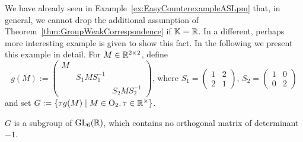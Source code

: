 We have already seen in Example~\ref{ex:EasyCounterexampleASLpm} that, in general, we cannot drop the additional assumption of Theorem~\ref{thm:GroupWeakCorrespondence} if $\mathbb K=\mathbb R$. In \cite{SiagaPaper} a different, perhaps more interesting example is given to show this fact. 
In the following we present this example \cite[Example~3.5]{SiagaPaper} in detail. For $M \in \mathbb R^{2 \times 2}$, define
\begin{equation}\label{eq:AKRSgroupExample3-5}
	g(M) := \begin{pmatrix} M & & \\ & S_1 M S_1^{-1} & \\ & & S_2 M S_2^{-1}	\end{pmatrix} \text{, where }
	S_1 = \begin{pmatrix} 1 & 2 \\ 2 & 1 \end{pmatrix}, \,
	S_2 = \begin{pmatrix} 1 & 0 \\ 0 & 2 \end{pmatrix}
\end{equation}
and set $G := \left\lbrace \tau g(M) \mid M \in \operatorname{O}_2, \tau \in \mathbb R^{\times} \right\rbrace$.

\begin{lemma}\label{lem:AKRSExample3-5}
	$G$ is a subgroup of $\operatorname{GL}_6(\mathbb R)$, which contains no orthogonal matrix of determinant $-1$.
\end{lemma}

